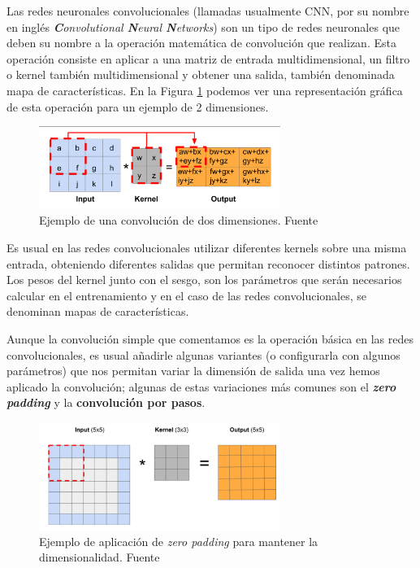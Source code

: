 Las redes neuronales convolucionales (llamadas usualmente CNN, por su nombre en inglés \textit{\textbf{C}onvolutional \textbf{N}eural \textbf{N}etworks}) son un tipo de redes neuronales que deben su nombre a la operación matemática de convolución que realizan. Esta operación consiste en aplicar a una matriz de entrada multidimensional, un filtro o kernel también multidimensional y obtener una salida, también denominada mapa de características. En la Figura \ref{fig:cnn1} podemos ver una representación gráfica de esta operación para un ejemplo de 2 dimensiones. 

\begin{figure}[!ht]
	\centering
	\includegraphics[width=0.7\textwidth]{images/arte/cnn1}
	\caption{Ejemplo de una convolución de dos dimensiones. Fuente \cite{temariodeeplearning}}
	\label{fig:cnn1}
\end{figure}

Es usual en las redes convolucionales  utilizar diferentes kernels sobre una misma entrada, obteniendo diferentes salidas que permitan reconocer distintos patrones. Los pesos del kernel junto con el sesgo, son los parámetros que serán necesarios calcular en el entrenamiento y en el caso de las redes convolucionales, se denominan mapas de características.

Aunque la convolución simple que comentamos es la operación básica en las redes convolucionales, es usual añadirle algunas variantes (o configurarla con algunos parámetros) que nos permitan variar la dimensión de salida una vez hemos aplicado la convolución; algunas de estas variaciones más comunes son el \textbf{\textit{zero padding}} y la \textbf{convolución por pasos}.

\begin{figure}[!ht]
	\centering
	\includegraphics[width=0.7\textwidth]{images/arte/padding}
	\caption{Ejemplo de aplicación de \textit{zero padding} para mantener la dimensionalidad. Fuente \cite{temariodeeplearning}}
	\label{fig:padding}
\end{figure}

